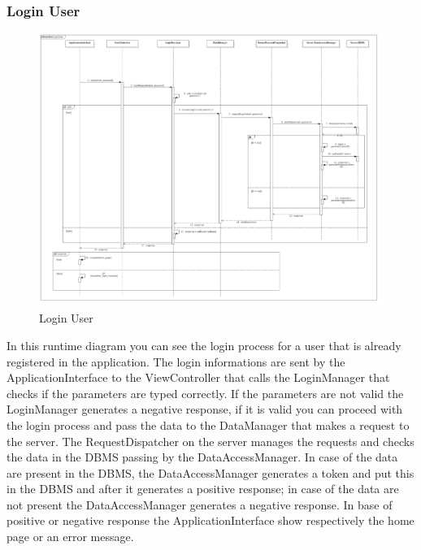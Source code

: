 \subsubsection{Login User}
\begin{figure}[H]
\centering
\includegraphics[scale=0.25]{images/LoginUser}
\caption{Login User}
\end{figure}In this runtime diagram you can see the login process for a user that is already registered in the application. The login informations are sent by the ApplicationInterface to the ViewController that calls the LoginManager that checks if the parameters are typed correctly. If the parameters are not valid the LoginManager generates a negative response, if it is valid you can proceed with the login process and pass the data to the DataManager that makes a request to the server. The RequestDispatcher on the server manages the requests and checks the data in the DBMS passing by the DataAccessManager. In case of the data are present in the DBMS, the DataAccessManager generates a token and put this in the DBMS and after it generates a positive response; in case of the data are not present the DataAccessManager generates a negative response. In base of positive or negative response the ApplicationInterface show respectively the home page or an error message.

